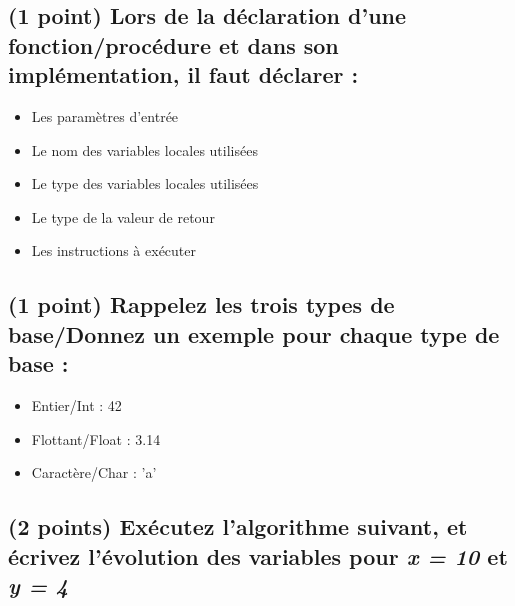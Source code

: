 \documentclass[11pt,a4paper]{article}
\begin{document}

\subsection{(1 point) Lors de la déclaration d'une fonction/procédure et dans son implémentation, il faut déclarer : }

\bigskip

\begin{itemize}
  \item[\CaseCoche] Les paramètres d'entrée
  \item[\CaseCoche] Le nom des variables locales utilisées
  \item[\CaseCoche] Le type des variables locales utilisées
  \item[\CaseCoche] Le type de la valeur de retour
  \item[\CaseCoche] Les instructions à exécuter
\end{itemize}


\subsection{(1 point) Rappelez les trois types de base/Donnez un exemple pour chaque type de base : }

\bigskip

\begin{itemize}
  \item[\CaseCoche] Entier/Int : 42
  \item[\CaseCoche] Flottant/Float : 3.14
  \item[\CaseCoche] Caractère/Char : 'a'
\end{itemize}

\newpage
\vfillFirst

\subsection{(2 points) Exécutez l'algorithme suivant, et écrivez l'évolution des variables pour \textit{x = 10} et \textit{y = 4} }

\end{document}
